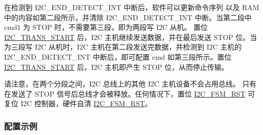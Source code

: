 \documentclass[main\_\_CN.tex]{subfiles}
\begin{document}
在检测到 I2C\_END\_DETECT\_INT 中断后，软件可以更新命令序列 以及 RAM 中的内容如第二段所示，并清除 I2C\_END\_DETECT\_INT 中断。当第二段中 cmd1 为 STOP 时，不需要第三段，即为两段写 I2C 从机。 置位 \hyperref[fielddesc:I2CTRANSSTART]{I2C\_TRANS\_START} 后，I2C 主机继续发送数据，并在最后发送 STOP 位。当为三段写  I2C 从机时，I2C 主机在第二段发送完数据，并检测到 I2C 主机的 I2C\_END\_DETECT\_INT 中断后，即可配置 cmd 如第三段所示。置位 \hyperref[fielddesc:I2CTRANSSTART]{I2C\_TRANS\_START} 后，I2C 主机即产生 STOP 位，从而停止传输。 

请注意，在两个分段之间，I2C 总线上的其他 I2C 主机设备不会占用总线。 只有在发送了 STOP 信号后总线才会被释放。任何情况下，置位 \hyperref[fielddesc:I2CFSMRST]{I2C\_FSM\_RST} 可复位 I2C 控制器，硬件自清 \hyperref[fielddesc:I2CFSMRST]{I2C\_FSM\_RST}。

\subsubsection{配置示例}
\end{document}
